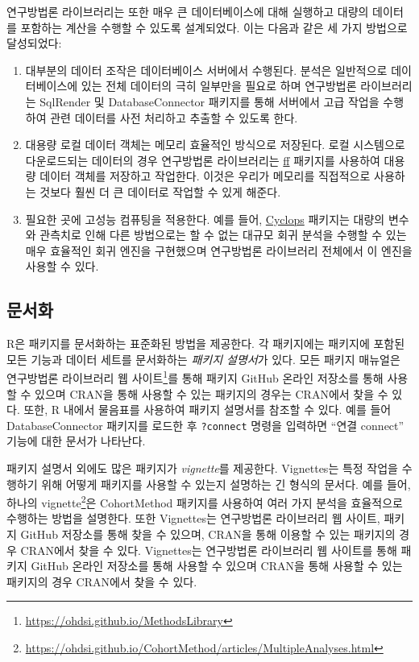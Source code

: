 \documentclass[10.5pt]{book}
\providecommand{\tightlist}{%
  \setlength{\itemsep}{0pt}\setlength{\parskip}{0pt}}
\let\rmarkdownfootnote\footnote%
\def\footnote{\protect\rmarkdownfootnote}
\theoremstyle{definition}
\theoremstyle{definition}
\theoremstyle{definition}
\theoremstyle{remark}
\begin{document}
연구방법론 라이브러리는 또한 매우 큰 데이터베이스에 대해 실행하고 대량의
데이터를 포함하는 계산을 수행할 수 있도록 설계되었다. 이는 다음과 같은
세 가지 방법으로 달성되었다:

\begin{enumerate}
\def\labelenumi{\arabic{enumi}.}
\tightlist
\item
  대부분의 데이터 조작은 데이터베이스 서버에서 수행된다. 분석은
  일반적으로 데이터베이스에 있는 전체 데이터의 극히 일부만을 필요로 하며
  연구방법론 라이브러리는 SqlRender 및 DatabaseConnector 패키지를 통해
  서버에서 고급 작업을 수행하여 관련 데이터를 사전 처리하고 추출할 수
  있도록 한다.
\item
  대용량 로컬 데이터 객체는 메모리 효율적인 방식으로 저장된다. 로컬
  시스템으로 다운로드되는 데이터의 경우 연구방법론 라이브러리는
  \href{https://cran.r-project.org/web/packages/ff}{ff} 패키지를
  사용하여 대용량 데이터 객체를 저장하고 작업한다. 이것은 우리가
  메모리를 직접적으로 사용하는 것보다 훨씬 더 큰 데이터로 작업할 수 있게
  해준다.
\item
  필요한 곳에 고성능 컴퓨팅을 적용한다. 예를 들어,
  \href{https://ohdsi.github.io/Cyclops/}{Cyclops} 패키지는 대량의
  변수와 관측치로 인해 다른 방법으로는 할 수 없는 대규모 회귀 분석을
  수행할 수 있는 매우 효율적인 회귀 엔진을 구현했으며 연구방법론
  라이브러리 전체에서 이 엔진을 사용할 수 있다.
\end{enumerate}

\subsection{문서화}

R은 패키지를 문서화하는 표준화된 방법을 제공한다. 각 패키지에는 패키지에
포함된 모든 기능과 데이터 세트를 문서화하는 \emph{패키지 설명서}가 있다.
모든 패키지 매뉴얼은 연구방법론 라이브러리 웹 사이트\footnote{\url{https://ohdsi.github.io/MethodsLibrary}}를
통해 패키지 GitHub 온라인 저장소를 통해 사용할 수 있으며 CRAN을 통해
사용할 수 있는 패키지의 경우는 CRAN에서 찾을 수 있다. 또한, R 내에서
물음표를 사용하여 패키지 설명서를 참조할 수 있다. 예를 들어
DatabaseConnector 패키지를 로드한 후 \texttt{?connect} 명령을 입력하면
``연결 connect'' 기능에 대한 문서가 나타난다.

패키지 설명서 외에도 많은 패키지가 \emph{vignette}를 제공한다.
Vignettes는 특정 작업을 수행하기 위해 어떻게 패키지를 사용할 수 있는지
설명하는 긴 형식의 문서다. 예를 들어, 하나의 vignette\footnote{\url{https://ohdsi.github.io/CohortMethod/articles/MultipleAnalyses.html}}은
CohortMethod 패키지를 사용하여 여러 가지 분석을 효율적으로 수행하는
방법을 설명한다. 또한 Vignettes는 연구방법론 라이브러리 웹 사이트,
패키지 GitHub 저장소를 통해 찾을 수 있으며, CRAN을 통해 이용할 수 있는
패키지의 경우 CRAN에서 찾을 수 있다. Vignettes는 연구방법론 라이브러리
웹 사이트를 통해 패키지 GitHub 온라인 저장소를 통해 사용할 수 있으며
CRAN을 통해 사용할 수 있는 패키지의 경우 CRAN에서 찾을 수 있다.
\end{document}

